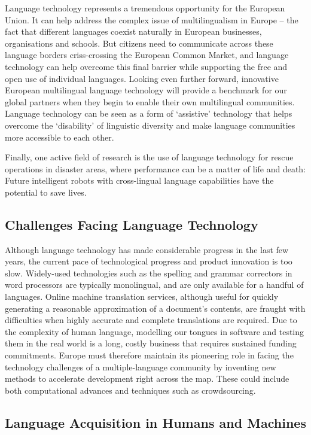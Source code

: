 \begin{multicols}{2}
    Language technology represents a tremendous opportunity for the European Union. It can help address the complex issue of multilingualism in Europe – the fact that different languages coexist naturally in European businesses, organisations and schools. But citizens need to communicate across these language borders criss-crossing the European Common Market, and language technology can help overcome this final barrier while supporting the free and open use of individual languages. Looking even further forward, innovative European multilingual language technology will provide a benchmark for our global partners when they begin to enable their own multilingual communities. Language technology can be seen as a form of ‘assistive’ technology that helps overcome the ‘disability’ of linguistic diversity and make language communities more accessible to each other.

    Finally, one active field of research is the use of language technology for rescue operations in disaster areas, where performance can be a matter of life and death: Future intelligent robots with cross-lingual language capabilities have the potential to save lives.

\subsection{Challenges Facing Language Technology}

    Although language technology has made considerable progress in the last few years, the current pace of technological progress and product innovation is too slow. 
Widely-used technologies such as the spelling and grammar correctors in word processors are typically monolingual, and are only available for a handful of languages. Online machine translation services, although useful for quickly generating a reasonable approximation of a document’s contents, are fraught with difficulties when highly accurate and complete translations are required. Due to the complexity of human language, modelling our tongues in software and testing them in the real world is a long, costly business that requires sustained funding commitments. Europe must therefore maintain its pioneering role in facing the technology challenges of a multiple-language community by inventing new methods to accelerate development right across the map. These could include both computational advances and techniques such as crowdsourcing.

\subsection{Language Acquisition in Humans and Machines}


\end{multicols}
